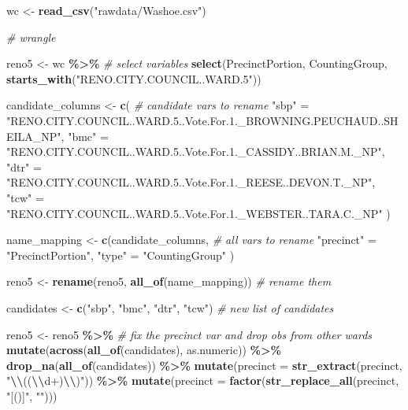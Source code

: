 \documentclass[10pt]{article}
\newenvironment{Shaded}{\begin{snugshade}}{\end{snugshade}}
\newcommand{\AttributeTok}[1]{\textcolor[rgb]{0.13,0.29,0.53}{#1}}
\newcommand{\CommentTok}[1]{\textcolor[rgb]{0.56,0.35,0.01}{\textit{#1}}}
\newcommand{\FunctionTok}[1]{\textcolor[rgb]{0.13,0.29,0.53}{\textbf{#1}}}
\newcommand{\NormalTok}[1]{#1}
\newcommand{\OtherTok}[1]{\textcolor[rgb]{0.56,0.35,0.01}{#1}}
\newcommand{\SpecialCharTok}[1]{\textcolor[rgb]{0.81,0.36,0.00}{\textbf{#1}}}
\newcommand{\StringTok}[1]{\textcolor[rgb]{0.31,0.60,0.02}{#1}}
\begin{document}
\begin{Shaded}
\begin{Highlighting}[]
\NormalTok{wc }\OtherTok{\textless{}{-}} \FunctionTok{read\_csv}\NormalTok{(}\StringTok{"rawdata/Washoe.csv"}\NormalTok{)}

\CommentTok{\# wrangle}

\NormalTok{reno5 }\OtherTok{\textless{}{-}}\NormalTok{ wc }\SpecialCharTok{\%\textgreater{}\%} \CommentTok{\# select variables}
  \FunctionTok{select}\NormalTok{(PrecinctPortion, CountingGroup,}
         \FunctionTok{starts\_with}\NormalTok{(}\StringTok{"RENO.CITY.COUNCIL..WARD.5"}\NormalTok{))}

\NormalTok{candidate\_columns }\OtherTok{\textless{}{-}} \FunctionTok{c}\NormalTok{( }\CommentTok{\# candidate vars to rename}
  \StringTok{"sbp"} \OtherTok{=} \StringTok{"RENO.CITY.COUNCIL..WARD.5..Vote.For.1.\_BROWNING.PEUCHAUD..SHEILA\_NP"}\NormalTok{,}
  \StringTok{"bmc"} \OtherTok{=} \StringTok{"RENO.CITY.COUNCIL..WARD.5..Vote.For.1.\_CASSIDY..BRIAN.M.\_NP"}\NormalTok{,}
  \StringTok{"dtr"} \OtherTok{=} \StringTok{"RENO.CITY.COUNCIL..WARD.5..Vote.For.1.\_REESE..DEVON.T.\_NP"}\NormalTok{,}
  \StringTok{"tcw"} \OtherTok{=} \StringTok{"RENO.CITY.COUNCIL..WARD.5..Vote.For.1.\_WEBSTER..TARA.C.\_NP"}
\NormalTok{)}

\NormalTok{name\_mapping }\OtherTok{\textless{}{-}} \FunctionTok{c}\NormalTok{(candidate\_columns, }\CommentTok{\# all vars to rename}
  \StringTok{"precinct"} \OtherTok{=} \StringTok{"PrecinctPortion"}\NormalTok{,}
  \StringTok{"type"}     \OtherTok{=} \StringTok{"CountingGroup"}
\NormalTok{)}

\NormalTok{reno5 }\OtherTok{\textless{}{-}} \FunctionTok{rename}\NormalTok{(reno5, }\FunctionTok{all\_of}\NormalTok{(name\_mapping)) }\CommentTok{\# rename them}

\NormalTok{candidates }\OtherTok{\textless{}{-}} \FunctionTok{c}\NormalTok{(}\StringTok{"sbp"}\NormalTok{, }\StringTok{"bmc"}\NormalTok{, }\StringTok{"dtr"}\NormalTok{, }\StringTok{"tcw"}\NormalTok{) }\CommentTok{\# new list of candidates}

\NormalTok{reno5 }\OtherTok{\textless{}{-}}\NormalTok{ reno5 }\SpecialCharTok{\%\textgreater{}\%} \CommentTok{\# fix the precinct var and drop obs from other wards}
  \FunctionTok{mutate}\NormalTok{(}\FunctionTok{across}\NormalTok{(}\FunctionTok{all\_of}\NormalTok{(candidates), as.numeric)) }\SpecialCharTok{\%\textgreater{}\%}
  \FunctionTok{drop\_na}\NormalTok{(}\FunctionTok{all\_of}\NormalTok{(candidates)) }\SpecialCharTok{\%\textgreater{}\%}
  \FunctionTok{mutate}\NormalTok{(}\AttributeTok{precinct =} \FunctionTok{str\_extract}\NormalTok{(precinct, }\StringTok{"}\SpecialCharTok{\textbackslash{}\textbackslash{}}\StringTok{((}\SpecialCharTok{\textbackslash{}\textbackslash{}}\StringTok{d+)}\SpecialCharTok{\textbackslash{}\textbackslash{}}\StringTok{)"}\NormalTok{)) }\SpecialCharTok{\%\textgreater{}\%}
  \FunctionTok{mutate}\NormalTok{(}\AttributeTok{precinct =} \FunctionTok{factor}\NormalTok{(}\FunctionTok{str\_replace\_all}\NormalTok{(precinct, }\StringTok{"[()]"}\NormalTok{, }\StringTok{""}\NormalTok{)))}


\end{Highlighting}
\end{Shaded}
\end{document}
